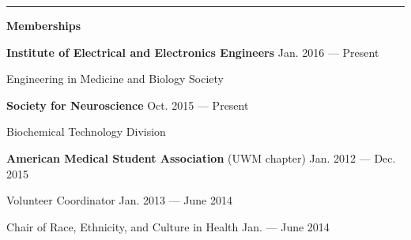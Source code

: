 \documentclass[10pt, oneside]{article}
\newcommand{\hRule}{\textcolor[RGB]{110,110,110}{\rule{\linewidth}{0.2pt}}}
\begin{document}





\hRule{}

{\large \textbf{Memberships}} %

 \textbf{Institute of Electrical and Electronics Engineers} \hfill{Jan. 2016 --- Present}
 
	 \hspace{9mm} Engineering in Medicine and Biology Society 

	 \textbf{Society for Neuroscience} \hfill{Oct. 2015 --- Present}
	 
	 
	 \hspace{9mm} Biochemical Technology Division
	 
	 \textbf{American Medical Student Association}  (UWM chapter) \hfill{Jan. 2012 --- Dec. 2015} 
	 

	
	 \hspace{10mm}Volunteer Coordinator \hfill{Jan. 2013 --- June 2014}
	 
	 	\hspace{10mm}Chair of Race, Ethnicity, and Culture in Health \hfill{Jan. --- June 2014}  
		
\end{document}
